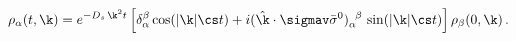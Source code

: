 \begin{equation} \label{eq:rho-evolution}
   \rho_\alpha(t,\k)
   =
   e^{-D_s \, \k^2 t}
    \left[
	\delta_\alpha^\beta \cos(|\k| \cs t)
	+ i (\hat{\k} \cdot \sigmav \bar{\sigma}^0)_\alpha^{\;\;\beta} \,
	     \sin(|\k| \cs t)
    \right]
    \rho_\beta(0,\k) \,.
\end{equation}

